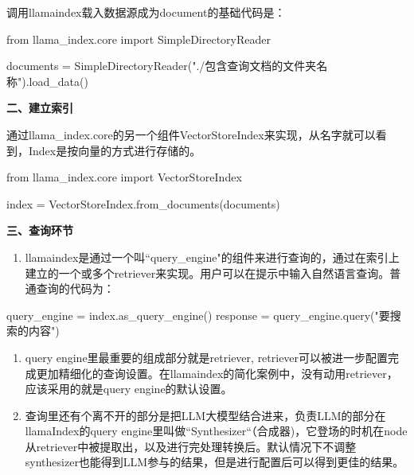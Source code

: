 \documentclass[
]{article}
\newenvironment{Shaded}{}{}
\newcommand{\NormalTok}[1]{#1}
\begin{document}
调用llamaindex载入数据源成为document的基础代码是：

\begin{Shaded}
\begin{Highlighting}[]
\NormalTok{from llama\_index.core import SimpleDirectoryReader
}
\NormalTok{documents = SimpleDirectoryReader("./包含查询文档的文件夹名称").load\_data()}
\end{Highlighting}
\end{Shaded}

\textbf{二、建立索引}

通过llama\_index.core的另一个组件VectorStoreIndex来实现，从名字就可以看到，Index是按向量的方式进行存储的。

\begin{Shaded}
\begin{Highlighting}[]
\NormalTok{from llama\_index.core import VectorStoreIndex
}
\NormalTok{index = VectorStoreIndex.from\_documents(documents)}
\end{Highlighting}
\end{Shaded}

\textbf{三、查询环节}

\begin{enumerate}
\def\labelenumi{\arabic{enumi}.}
\item
  llamaindex是通过一个叫``query\_engine"的组件来进行查询的，通过在索引上建立的一个或多个retriever来实现。用户可以在提示中输入自然语言查询。普通查询的代码为：
\end{enumerate}

\begin{Shaded}
\begin{Highlighting}[]
\NormalTok{query\_engine = index.as\_query\_engine()}
\NormalTok{response = query\_engine.query("要搜索的内容")}
\end{Highlighting}
\end{Shaded}

\begin{enumerate}
\def\labelenumi{\arabic{enumi}.}
\item
  query engine里最重要的组成部分就是retriever,
  retriever可以被进一步配置完成更加精细化的查询设置。在llamaindex的简化案例中，没有动用retriever，应该采用的就是query
  engine的默认设置。
\item
  查询里还有个离不开的部分是把LLM大模型结合进来，负责LLM的部分在llamaIndex的query
  engine里叫做``Synthesizer``（合成器)，它登场的时机在node从retriever中被提取出，以及进行完处理转换后。默认情况下不调整synthesizer也能得到LLM参与的结果，但是进行配置后可以得到更佳的结果。
\end{enumerate}
\end{document}
